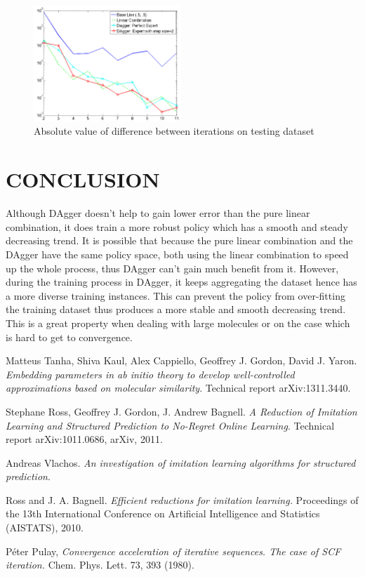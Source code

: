 \documentclass[twoside]{article}
\begin{document}
\begin{figure}[h!]

  \caption{Absolute value of difference between iterations on testing dataset}
  \label{fig:converge_testing}
    \includegraphics[width=210px]{convergence_Testing.jpg}
\end{figure}


\section{CONCLUSION}

Although DAgger doesn't help to gain lower error than the pure linear combination, it does train a more robust policy which has a smooth and steady decreasing trend. It is possible that because the pure linear combination and the DAgger have the same policy space, both using the linear combination to speed up the whole process, thus DAgger can't gain much benefit from it. However, during the training process in DAgger, it keeps aggregating the dataset hence has a more diverse training instances. This can prevent the policy from over-fitting the training dataset thus produces a more stable and smooth decreasing trend. This is a great property when dealing with large molecules or on the case which is hard to get to convergence.


\begin{thebibliography}{9}
  Matteus Tanha, Shiva Kaul, Alex Cappiello, Geoffrey J. Gordon, David J. Yaron.
  \emph{Embedding parameters in ab initio theory to develop well-controlled approximations based on molecular similarity}.
  Technical report arXiv:1311.3440.
  
  Stephane Ross, Geoffrey J. Gordon, J. Andrew Bagnell.
  \emph{A Reduction of Imitation Learning and Structured Prediction to No-Regret Online Learning}.
  Technical report arXiv:1011.0686, arXiv, 2011.
  
  Andreas Vlachos.
  \emph{An investigation of imitation learning algorithms for structured prediction}.
  
    Ross and J. A. Bagnell.
  \emph{Efficient reductions for imitation
learning.} Proceedings of the 13th International
Conference on Artificial Intelligence and Statistics (AISTATS),
2010.

   Péter Pulay,
  \emph{Convergence acceleration of iterative sequences. The case of SCF iteration.} Chem. Phys. Lett. 73, 393 (1980).

\end{thebibliography}
\end{document}
